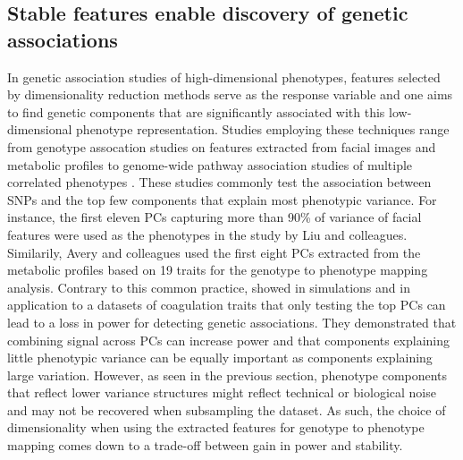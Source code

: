 \subsection{Stable features enable discovery of genetic associations}
\label{subsection:association-DimRed}
In genetic association studies of high-dimensional phenotypes, features selected by dimensionality reduction methods serve as the response variable and one aims to find genetic components that are significantly associated with this low-dimensional phenotype representation. Studies employing these techniques range from genotype assocation studies on features extracted from facial images \citep{Liu2012} and metabolic profiles \citep{Avery2011} to genome-wide pathway association studies of multiple correlated phenotypes \citep{Zhang2012}. These studies commonly test the association between SNPs and the top few components that explain most phenotypic variance. For instance,  the first eleven PCs capturing more than \num{90}\% of variance of facial features were used as the phenotypes in the study by Liu and colleagues. Similarily, Avery and colleagues used the first eight PCs extracted from the metabolic profiles based on \num{19} traits for the genotype to phenotype mapping analysis. Contrary to this common practice, \citet{Aschard2014} showed in simulations and in application to a datasets of coagulation traits that only testing the top PCs can lead to a loss in power for detecting genetic associations. They demonstrated that combining signal across PCs can increase power and that components explaining little phenotypic variance can be equally important as components explaining large variation. However, as seen in the previous section, phenotype components that reflect lower variance structures might reflect technical or biological noise and may not be recovered when subsampling the dataset. As such, the choice of dimensionality when using the extracted features for genotype to phenotype mapping comes down to a trade-off between gain in power and stability.



